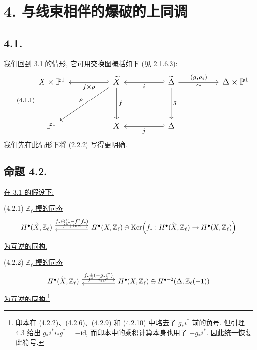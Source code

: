 \section*{4. 与线束相伴的爆破的上同调}

\subsection*{4.1.}
我们回到 3.1 的情形, 它可用交换图概括如下 (见 2.1.6.3):
\begin{equation}\tag{4.1.1}
\resizebox{\textwidth}{!}{%
\begin{tikzcd}[ampersand replacement=\&,row sep=huge,column sep=huge]
X\times\mathbb P^1
  \& \widetilde X
      \arrow[l,hook',"f\times\rho"]
      \arrow[d,"f"]
      \arrow[dl,"\rho"']
  \& \widetilde\Delta
      \arrow[l,hook',"i"]
      \arrow[d,"g"]
      \arrow[r,"{(g,\rho_i)}","\sim"']
  \& \Delta\times\mathbb P^1 \\
\mathbb P^1 \& X \& \Delta\arrow[l,hook',"j"] \& {}
\end{tikzcd}}
\end{equation}
我们先在此情形下将 (2.2.2) 写得更明确.

\subsection*{命题 4.2.}
\underline{在 3.1 的假设下:}

\smallskip
\noindent
\textup{(4.2.1)} \underline{$\mathbb Z_\ell$-模的同态}
\[
\begin{tikzcd}[column sep=huge]
H^\bullet(\widetilde X,\mathbb Z_\ell)
  \arrow[r,shift left=.7ex,"f_*\oplus(1-f^*f_*)"]
& H^\bullet(X,\mathbb Z_\ell)\oplus
   \operatorname{Ker}\!\left(f_*:H^\bullet(\widetilde X,\mathbb Z_\ell)
       \to H^\bullet(X,\mathbb Z_\ell)\right)
  \arrow[l,shift left=.7ex,"f^*+\operatorname{incl}"']
\end{tikzcd}
\]
\underline{为互逆的同构.}

\smallskip
\noindent
\textup{(4.2.2)} \underline{$\mathbb Z_\ell$-模的同态}
\[
\begin{tikzcd}[column sep=huge]
H^\bullet(\widetilde X,\mathbb Z_\ell)
  \arrow[r,shift left=.7ex,"f_*\oplus(-g_*i^*)"]
& H^\bullet(X,\mathbb Z_\ell)\oplus
   H^{\bullet-2}(\Delta,\mathbb Z_\ell(-1))
  \arrow[l,shift left=.7ex,"f^*+i_*g^*"']
\end{tikzcd}
\]
\underline{为互逆的同构.}\footnote{印本在 (4.2.2)、(4.2.6)、(4.2.9) 和 (4.2.10) 中略去了 $g_*i^*$ 前的负号. 但引理 4.3 给出 $g_*i^*i_*g^*=-\mathrm{id}$, 而印本中的乘积计算本身也用了 $-g_*i^*$. 因此统一恢复此符号.}

